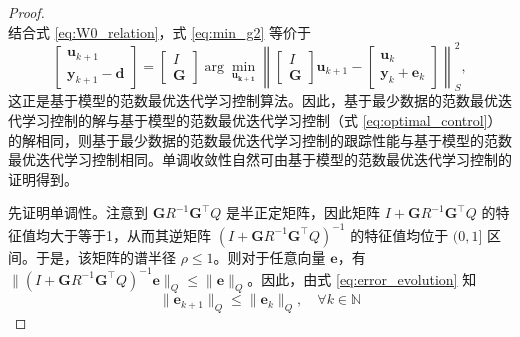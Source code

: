 \begin{proof}
\begin{equation}
		\label{eq:min_g2}
	\end{equation}
	结合式 \eqref{eq:W0_relation}，式 \eqref{eq:min_g2} 等价于
	\begin{equation}
		\begin{bmatrix} \mathbf{u}_{k+1} \\ \mathbf{y}_{k+1} - \mathbf{d} \end{bmatrix} = \begin{bmatrix} I \\ \mathbf{G} \end{bmatrix} \arg\min_\mathbf{{u_{k+1}}} \left\| \begin{bmatrix} I \\ \mathbf{G} \end{bmatrix} \mathbf{u}_{k+1} - \begin{bmatrix} \mathbf{u}_k \\ \mathbf{y}_k + \mathbf{e}_k \end{bmatrix} \right\|_S^2,
		\label{eq:equiv_model}
	\end{equation}
	这正是基于模型的范数最优迭代学习控制算法。因此，基于最少数据的范数最优迭代学习控制的解与基于模型的范数最优迭代学习控制（式 \eqref{eq:optimal_control}）的解相同，则基于最少数据的范数最优迭代学习控制的跟踪性能与基于模型的范数最优迭代学习控制相同。单调收敛性自然可由基于模型的范数最优迭代学习控制的证明得到。 
	
	先证明单调性。注意到 \(\mathbf{G} R^{-1} \mathbf{G}^\top Q\) 是半正定矩阵，因此矩阵 \(I + \mathbf{G} R^{-1} \mathbf{G}^\top Q\) 的特征值均大于等于1，从而其逆矩阵 \((I + \mathbf{G} R^{-1} \mathbf{G}^\top Q)^{-1}\) 的特征值均位于 \((0,1]\) 区间。于是，该矩阵的谱半径 \(\rho \le 1\)。则对于任意向量 \(\mathbf{e}\)，有 \(\|(I + \mathbf{G} R^{-1} \mathbf{G}^\top Q)^{-1} \mathbf{e}\|_Q \le \|\mathbf{e}\|_Q\)。因此，由式 \eqref{eq:error_evolution} 知
	\begin{equation}
		\|\mathbf{e}_{k+1}\|_Q \le \|\mathbf{e}_k\|_Q, \quad \forall k \in \mathbb{N}  
	\end{equation}
	

\end{proof}
